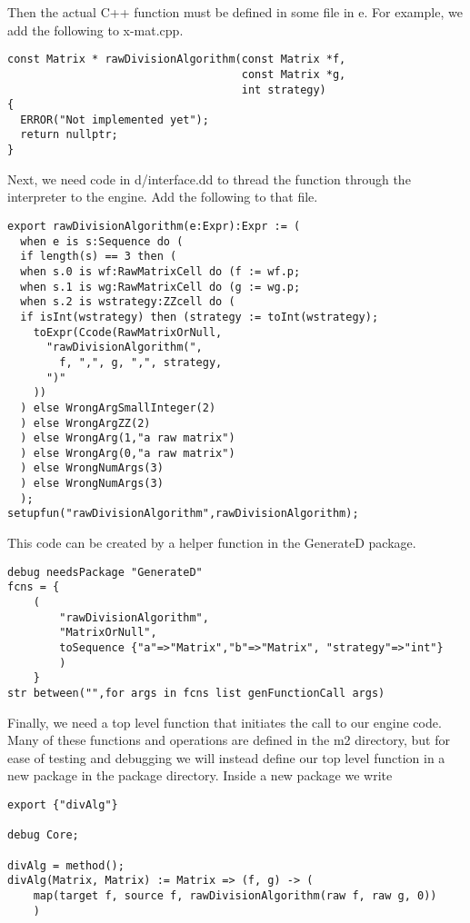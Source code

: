 \documentclass{article}
\begin{document}
Then the actual C++ function must be defined in some file in e.
For example, we add the following to x-mat.cpp.
\begin{verbatim}
const Matrix * rawDivisionAlgorithm(const Matrix *f,
                                    const Matrix *g,
                                    int strategy)
{
  ERROR("Not implemented yet");
  return nullptr;
}
\end{verbatim}

Next, we need code in d/interface.dd to thread the function through the interpreter to the engine.
Add the following to that file.
\begin{verbatim}
export rawDivisionAlgorithm(e:Expr):Expr := (
  when e is s:Sequence do (
  if length(s) == 3 then (
  when s.0 is wf:RawMatrixCell do (f := wf.p;
  when s.1 is wg:RawMatrixCell do (g := wg.p;
  when s.2 is wstrategy:ZZcell do (
  if isInt(wstrategy) then (strategy := toInt(wstrategy);
    toExpr(Ccode(RawMatrixOrNull,
      "rawDivisionAlgorithm(",
        f, ",", g, ",", strategy,
      ")"
    ))
  ) else WrongArgSmallInteger(2)
  ) else WrongArgZZ(2)
  ) else WrongArg(1,"a raw matrix")
  ) else WrongArg(0,"a raw matrix")
  ) else WrongNumArgs(3)
  ) else WrongNumArgs(3)
  );
setupfun("rawDivisionAlgorithm",rawDivisionAlgorithm);
\end{verbatim}

This code can be created by a helper function in the GenerateD package.
\begin{verbatim}
debug needsPackage "GenerateD"
fcns = {
    (
        "rawDivisionAlgorithm",
        "MatrixOrNull",
        toSequence {"a"=>"Matrix","b"=>"Matrix", "strategy"=>"int"}
        )
    }
str between("",for args in fcns list genFunctionCall args)
\end{verbatim}

Finally, we need a top level function that initiates the call to our engine code.
Many of these functions and operations are defined in the m2 directory, but for ease of testing and debugging we will instead define our top level function in a new package in the package directory.
Inside a new package we write
\begin{verbatim}
export {"divAlg"}

debug Core;

divAlg = method();
divAlg(Matrix, Matrix) := Matrix => (f, g) -> (
    map(target f, source f, rawDivisionAlgorithm(raw f, raw g, 0))
    )
\end{verbatim}
\end{document}
